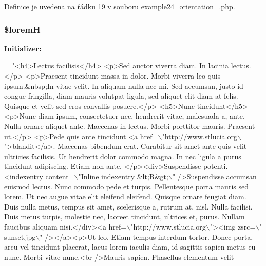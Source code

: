 Definice je uvedena na řádku 19 v souboru example24\-\_\-orientation\-\_.\-php.

\hypertarget{example24__orientation__2_8php_afa412b3521b3f79c4a953d445052dc2f}{
\subsubsection[{\$lorem\-H}]{\setlength{\rightskip}{0pt plus 5cm}\$lorem\-H}}\label{example24__orientation__2_8php_afa412b3521b3f79c4a953d445052dc2f}
{\bfseries Initializer\-:}
\begin{DoxyCode}
= \textcolor{stringliteral}{"<h4>Lectus facilisis</h4>}
\textcolor{stringliteral}{<p>Sed auctor viverra diam. In lacinia lectus.</p>}
\textcolor{stringliteral}{<p>Praesent tincidunt massa in dolor. Morbi viverra leo quis ipsum.&nbsp;In vitae velit. In aliquam nulla
       nec mi. Sed accumsan, justo id congue fringilla, diam mauris volutpat ligula, sed aliquet elit diam at felis.
       Quisque et velit sed eros convallis posuere.</p>}
\textcolor{stringliteral}{<h5>Nunc tincidunt</h5>}
\textcolor{stringliteral}{<p>Nunc diam ipsum, consectetuer nec, hendrerit vitae, malesuada a, ante. Nulla ornare aliquet ante.
       Maecenas in lectus. Morbi porttitor mauris. Praesent ut.</p>}
\textcolor{stringliteral}{<p>Pede quis ante tincidunt <a href=\(\backslash\)"http://www.stlucia.org\(\backslash\)">blandit</a>. Maecenas bibendum erat.
       Curabitur sit amet ante quis velit ultricies facilisis. Ut hendrerit dolor commodo magna. In nec ligula a purus
       tincidunt adipiscing. Etiam non ante. </p><div>Suspendisse potenti. <indexentry content=\(\backslash\)"Inline indexentry
       &lt;B&gt;\(\backslash\)" />Suspendisse accumsan euismod lectus. Nunc commodo pede et turpis. Pellentesque porta mauris sed
       lorem. Ut nec augue vitae elit eleifend eleifend. Quisque ornare feugiat diam. Duis nulla metus, tempus sit
       amet, scelerisque a, rutrum at, nisl. Nulla facilisi. Duis metus turpis, molestie nec, laoreet tincidunt,
       ultrices et, purus. Nullam faucibus aliquam nisi.</div><a href=\(\backslash\)"http://www.stlucia.org\(\backslash\)"><img zsrc=\(\backslash\)"
      sunset.jpg\(\backslash\)" /></a><p>Ut leo. Etiam tempus interdum tortor. Donec porta, arcu vel tincidunt placerat, lacus lorem
       iaculis diam, id sagittis sapien metus eu nunc. Morbi vitae nunc.<br />Mauris sapien. Phasellus elementum velit
}
\end{DoxyCode}
